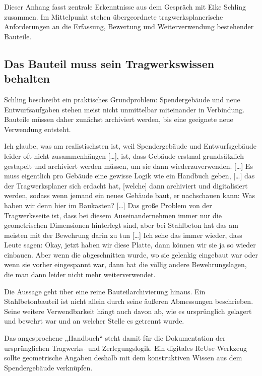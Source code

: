 \label{anlage:interview-schling}

Dieser Anhang fasst zentrale Erkenntnisse aus dem Gespräch mit Eike Schling zusammen. Im Mittelpunkt stehen übergeordnete tragwerksplanerische Anforderungen an die Erfassung, Bewertung und Weiterverwendung bestehender Bauteile.

\subsection{Das Bauteil muss sein Tragwerkswissen behalten}

Schling beschreibt ein praktisches Grundproblem: Spendergebäude und neue Entwurfsaufgaben stehen meist nicht unmittelbar miteinander in Verbindung. Bauteile müssen daher zunächst archiviert werden, bis eine geeignete neue Verwendung entsteht.

\begin{Blockquote}
Ich glaube, was am realistischsten ist, weil Spendergebäude und Entwurfsgebäude leider oft nicht zusammenhängen […], ist, dass Gebäude erstmal grundsätzlich gestapelt und archiviert werden müssen, um sie dann wiederzuverwenden. […] Es muss eigentlich pro Gebäude eine gewisse Logik wie ein Handbuch geben, […] das der Tragwerksplaner sich erdacht hat, [welche] dann archiviert und digitalisiert werden, sodass wenn jemand ein neues Gebäude baut, er nachschauen kann: Was haben wir denn hier im Baukasten? […] Das große Problem von der Tragwerksseite ist, dass bei diesem Auseinandernehmen immer nur die geometrischen Dimensionen hinterlegt sind, aber bei Stahlbeton hat das am meisten mit der Bewehrung darin zu tun […] Ich sehe das immer wieder, dass Leute sagen: Okay, jetzt haben wir diese Platte, dann können wir sie ja so wieder einbauen. Aber wenn die abgeschnitten wurde, wo sie gelenkig eingebaut war oder wenn sie vorher eingespannt war, dann hat die völlig andere Bewehrungslagen, die man dann leider nicht mehr weiterverwendet.
\end{Blockquote}

Die Aussage geht über eine reine Bauteilarchivierung hinaus. Ein Stahlbetonbauteil ist nicht allein durch seine äußeren Abmessungen beschrieben. Seine weitere Verwendbarkeit hängt auch davon ab, wie es ursprünglich gelagert und bewehrt war und an welcher Stelle es getrennt wurde.

Das angesprochene „Handbuch“ steht damit für die Dokumentation der ursprünglichen Tragwerks- und Zerlegungslogik. Ein digitales ReUse-Werkzeug sollte geometrische Angaben deshalb mit dem konstruktiven Wissen aus dem Spendergebäude verknüpfen.

